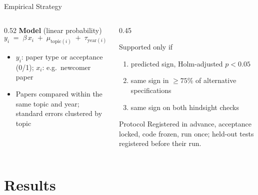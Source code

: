 \documentclass[aspectratio=169,11pt]{beamer}
\begin{document}
\begin{frame}{Empirical Strategy}
  \begin{columns}[T]
    \begin{column}{0.52\textwidth}
      \textbf{Model} (linear probability)
      \[
        y_i \;=\; \beta\, x_i \;+\; \mu_{\text{topic}(i)} \;+\; \tau_{\text{year}(i)} \;+\; \varepsilon_i
      \]
      \small
      \begin{itemize}\setlength{\itemsep}{0.4em}
        \item $y_i$: paper type or acceptance (0/1); $x_i$: e.g.\ newcomer paper
        \item Papers compared within the same topic and year; standard errors clustered by topic
      \end{itemize}
    \end{column}
    \begin{column}{0.45\textwidth}
      \begin{block}{Supported only if}
        \small
        \begin{enumerate}
          \item predicted sign, Holm-adjusted $p < 0.05$
          \item same sign in ${\geq}75\%$ of alternative specifications
          \item same sign on both hindsight checks
        \end{enumerate}
      \end{block}
      \begin{block}{Protocol}
        \small Registered in advance, acceptance locked, code frozen, run once; held-out tests registered before
        their run.
      \end{block}
    \end{column}
  \end{columns}
\end{frame}

\section{Results}
\end{document}

